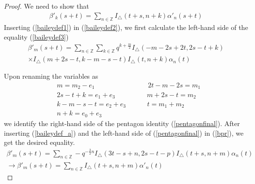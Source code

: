 \documentclass[10pt,a4paper]{amsart}
\begin{document}
\begin{proof} We need to show that
\begin{align}
     \beta'_k (s + t)= \sum_{n \in \mathbb{Z}} I_{\triangle}(t + s, n + k) \alpha'_n(s + t)
     \label{baileydef3}
\end{align}
Inserting (\ref{baileydef1}) in (\ref{baileydef2}), we first calculate the left-hand side of the equality (\ref{baileydef3})
\begin{multline} \label{bpr}
    \beta'_m(s + t)= 
    \sum_{n \in \mathbb{Z}} \sum_{k \in \mathbb{Z}}q^{k + \frac{m}{2}}  I_{\triangle}(-m - 2s + 2t,2s - t + k)\\ \times I_{\triangle}(m + 2s - t,k -m - s - t)  I_{\triangle}(t, n + k) \alpha_n(t) \end{multline}

Upon renaming the variables as
\begin{align}
    &m = m_2 - e_1  \qquad \qquad \quad \qquad \; \; \;
    2t -m - 2s = m_1 \\ 
    &2s - t + k = e_1 + e_3   \qquad \; \; \; \; \; \; \quad
    m + 2s - t = m_2 \\
    &k - m - s - t= e_2 + e_3  \; \; \; \;  \qquad
    t = m_1 + m_2 \\
    &n + k = e_0 + e_3
\end{align}
we identify the right-hand side of the pentagon identity (\ref{pentagonfinal}). After inserting (\ref{baileydef_a}) and the left-hand side of (\ref{pentagonfinal}) in (\ref{bpr}), we get the desired equality.
\begin{gather} \nonumber
    \beta'_m(s + t)=  \sum_{n \in \mathbb{Z}} -q^{-\frac{3}{2}n}I_{\triangle}(3t - s + n,2s - t  - p)I_{\triangle}(t+s, n+m)\alpha_n(t) \\
       \xrightarrow{} \beta'_m(s + t) =  \sum_{n \in \mathbb{Z}} I_{\triangle}(t+s, n+m)\alpha'_n(t)
\end{gather}
\end{proof}
\end{document}

